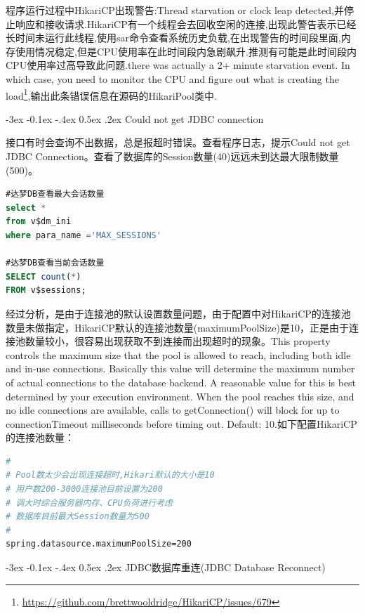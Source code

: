 \documentclass[12pt]{book}
\makeatletter
\numberwithin{dummy}{section}
\theoremstyle{ocrenumbox}
\theoremstyle{blacknumex}
\theoremstyle{blacknumbox}
\theoremstyle{ocrenum}
\renewcommand{\subsection}{\@startsection {subsection}{2}{\z@}
	{-3ex \@plus -0.1ex \@minus -.4ex}
	{0.5ex \@plus.2ex }
	{\normalfont\sffamily\bfseries}}
\makeatother
\begin{document}
程序运行过程中HikariCP出现警告:Thread starvation or clock leap detected,并停止响应和接收请求.HikariCP有一个线程会去回收空闲的连接,出现此警告表示已经长时间未运行此线程,使用sar命令查看系统历史负载,在出现警告的时间段里面,内存使用情况稳定,但是CPU使用率在此时间段内急剧飙升.推测有可能是此时间段内CPU使用率过高导致此问题.there was actually a 2+ minute starvation event. In which case, you need to monitor the CPU and figure out what is creating the load\footnote{\url{https://github.com/brettwooldridge/HikariCP/issues/679}},输出此条错误信息在源码的HikariPool类中.


\subsection{Could not get JDBC connection}

接口有时会查询不出数据，总是报超时错误。查看程序日志，提示Could not get JDBC Connection。查看了数据库的Session数量(40)远远未到达最大限制数量(500)。

\begin{lstlisting}[language=SQL]
#达梦DB查看最大会话数量
select *
from v$dm_ini
where para_name ='MAX_SESSIONS'

#达梦DB查看当前会话数量
SELECT count(*)
FROM v$sessions;
\end{lstlisting}

经过分析，是由于连接池的默认设置数量问题，由于配置中对HikariCP的连接池数量未做指定，HikariCP默认的连接池数量(maximumPoolSize)是10，正是由于连接池数量较小，很容易出现获取不到连接而出现超时的现象。This property controls the maximum size that the pool is allowed to reach, including both idle and in-use connections. Basically this value will determine the maximum number of actual connections to the database backend. A reasonable value for this is best determined by your execution environment. When the pool reaches this size, and no idle connections are available, calls to getConnection() will block for up to connectionTimeout milliseconds before timing out. Default: 10.如下配置HikariCP的连接池数量：

\begin{lstlisting}[language=Bash]
#
# Pool数太少会出现连接超时,Hikari默认的大小是10
# 用户数200-3000连接池目前设置为200
# 调大时综合服务器内存、CPU负荷进行考虑
# 数据库目前最大Session数量为500
#
spring.datasource.maximumPoolSize=200
\end{lstlisting}


\subsection{JDBC数据库重连(JDBC Database Reconnect)}
\end{document}
